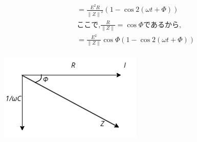 \documentclass[twocolumn]{article}
\begin{document}
\begin{enumerate}
\begin{align*}
          &= \frac{E^2R}{{\|Z\|}^2}\left(1 - \cos2\left(\omega t + \Phi\right)\right)\\
      &\text{ここで,}\frac{R}{\|Z\|} = \cos \Phi\text{であるから,}\\
          &= \frac{E^2}{{\|Z\|}}\cos\Phi\left(1 - \cos2\left(\omega t + \Phi\right)\right)\\
    \end{align*}
    \begin{center}
      \includegraphics[width=0.6\linewidth]{./capacitor_Vector_img.png}
    \end{center}
\end{enumerate}
\end{document}
